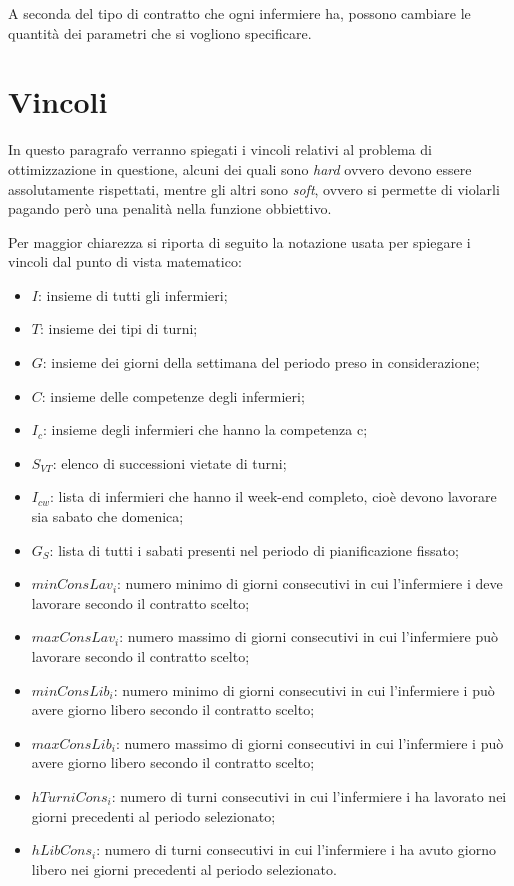 A seconda del tipo di contratto che ogni infermiere ha, possono cambiare le quantità dei parametri che si vogliono specificare. 






\section{Vincoli}
In questo paragrafo verranno spiegati i vincoli relativi al problema di ottimizzazione in questione, alcuni dei quali sono \textit{hard} ovvero devono essere assolutamente rispettati, mentre gli altri sono \textit{soft}, ovvero si permette di violarli pagando però una penalità nella funzione obbiettivo.

Per maggior chiarezza si riporta di seguito la notazione usata per spiegare i vincoli dal punto di vista matematico:
\begin{itemize}
\item $I$: insieme di tutti gli infermieri;
\item $T$: insieme dei tipi di turni;
\item $G$: insieme dei giorni della settimana del periodo preso in considerazione;
\item $C$: insieme delle competenze degli infermieri;
\item $I_c$: insieme degli infermieri che hanno la competenza c;
\item $S_{VT}$: elenco di successioni vietate di turni;
\item $I_{cw}$: lista di infermieri che hanno il week-end completo, cioè devono lavorare sia sabato che domenica;
\item $G_S$: lista di tutti i sabati presenti nel periodo di pianificazione fissato;
\item $minConsLav_i$: numero minimo di giorni consecutivi in cui l'infermiere i deve lavorare secondo il contratto scelto;
\item $maxConsLav_i$: numero massimo di giorni consecutivi in cui l'infermiere può lavorare secondo il contratto scelto;
\item $minConsLib_i$: numero minimo di giorni consecutivi in cui l'infermiere i può avere giorno libero secondo il contratto scelto;
\item $maxConsLib_i$: numero massimo di giorni consecutivi in cui l'infermiere i può avere giorno libero secondo il contratto scelto;
\item $hTurniCons_i$: numero di turni consecutivi in cui l'infermiere i ha lavorato nei giorni precedenti al periodo selezionato;
\item $hLibCons_i$: numero di turni consecutivi in cui l'infermiere i ha avuto giorno libero nei giorni precedenti al periodo selezionato.
\end{itemize}

